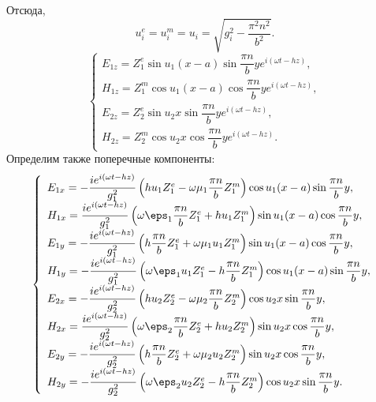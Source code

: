 \documentclass[a4paper]{article}
\renewcommand{\frac}{\dfrac}
\begin{document}
Отсюда,
\[
    u^e_i = u^m_i = u_i = \sqrt{g_i^2 - \frac{\pi^2n^2}{b^2}}.
\]
\[
    \left\{
    \begin{array}{l}
        E_{1z} = Z^e_1\sin u_1 (x-a) \sin \frac{\pi n}{b}y
        e^{i(\omega t - h z)},\\
        H_{1z} = Z^m_1\cos u_1 (x-a) \cos \frac{\pi n}{b}y
        e^{i(\omega t - h z)},\\
        E_{2z} = Z^e_2\sin u_2 x \sin \frac{\pi n}{b}y
        e^{i(\omega t - h z)},\\
        H_{2z} = Z^m_2\cos u_2 x \cos \frac{\pi n}{b}y
        e^{i(\omega t - h z)}.
    \end{array}
    \right.
\]
Определим также поперечные компоненты:
\[
    \left\{
    \begin{array}{l}
        E_{1x} = -\frac{i e^{i(\omega t - h z)}}{g_1^2}
        \left(h u_1 Z^e_1 - \omega\mu_1\frac{\pi n}{b}Z^m_1\right)
        \cos u_1 (x-a) \sin \frac{\pi n}{b}y,\\
        H_{1x} = \frac{i e^{i(\omega t - h z)}}{g_1^2}
        \left(\omega\eps_1\frac{\pi n}{b}Z^e_1+h u_1 Z^m_1\right)
        \sin u_1 (x-a) \cos \frac{\pi n}{b}y,\\
        E_{1y} = -\frac{i e^{i(\omega t - h z)}}{g_1^2}
        \left(h \frac{\pi n}{b} Z^e_1 + \omega\mu_1u_1Z^m_1\right)
        \sin u_1 (x-a) \cos \frac{\pi n}{b}y,\\
        H_{1y} = -\frac{i e^{i(\omega t - h z)}}{g_1^2}
        \left(\omega\eps_1u_1Z^e_1-h \frac{\pi n}{b} Z^m_1\right)
        \cos u_1 (x-a) \sin \frac{\pi n}{b}y,\\
        E_{2x} = -\frac{i e^{i(\omega t - h z)}}{g_2^2}
        \left(h u_2 Z^e_2 - \omega\mu_2\frac{\pi n}{b}Z^m_2\right)
        \cos u_2 x \sin \frac{\pi n}{b}y,\\
        H_{2x} = \frac{i e^{i(\omega t - h z)}}{g_2^2}
        \left(\omega\eps_2\frac{\pi n}{b}Z^e_2+h u_2 Z^m_2\right)
        \sin u_2 x \cos \frac{\pi n}{b}y,\\
        E_{2y} = -\frac{i e^{i(\omega t - h z)}}{g_2^2}
        \left(h \frac{\pi n}{b} Z^e_2 + \omega\mu_2u_2Z^m_2\right)
        \sin u_2 x \cos \frac{\pi n}{b}y,\\
        H_{2y} = -\frac{i e^{i(\omega t - h z)}}{g_2^2}
        \left(\omega\eps_2u_2Z^e_2-h \frac{\pi n}{b} Z^m_2\right)
        \cos u_2 x \sin \frac{\pi n}{b}y.
    \end{array}
    \right.
\]
\end{document}
